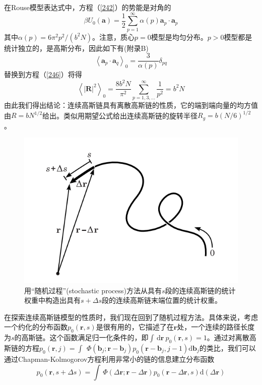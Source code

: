 在Rouse模型表达式中，方程（\ref{242}）的势能是对角的
\begin{equation}\label{255}
\beta U_0(\mathbf{a})=\frac{1}{2}\sum_{p=1}^{\infty}\alpha (p)\mathbf{a}_p \cdot \mathbf{a}_p
\end{equation}
其中$\alpha (p)=6\pi ^2p^2/(b^2N)$。注意，质心$p=0$模型是均匀分布。$p>0$模型都是统计独立的，是高斯分布，因此如下有(附录B)
\begin{equation}\label{256}
\left \langle \mathbf{a}_p \cdot \mathbf{a}_q \right \rangle _0=\frac{3}{\alpha (p)}\delta _{pq}
\end{equation}
替换到方程（\ref{246}）将得
\begin{equation}\label{257}
\left \langle \left| \mathbf{R} \right|^2 \right \rangle _0=\frac{8b^2N}{\pi ^2}\sum_{p=1,3,...}^{\infty}\frac{1}{p^2}=b^2N
\end{equation}
由此我们得出结论：连续高斯链具有离散高斯链的性质，它的端到端向量的均方值由$R=bN^{1/2}$给出。类似用期望公式给出连续高斯链的旋转半径$R_g=b(N/6)^{1/2}$。

\begin{figure}[H]
\centering
\includegraphics[scale=0.7]{./figures/42.png}
\caption{用“随机过程”(stochastic process)方法从具有$s$段的连续高斯链的统计权重中构造出具有$s+\Delta s$段的连续高斯链末端位置的统计权重。} \label{随机过程}
\end{figure}

在探索连续高斯链模型的性质时，我们现在回到了随机过程方法。具体来说，考虑一个约化的分布函数$p_0 (\mathbf{r},s)$是很有用的，它描述了在$\mathbf {r}$处，一个连续的路径长度为$s$的高斯链。这个函数满足归一化条件的，即$\int \, \mathrm{d} \mathbf{r}~p_0(\mathbf{r},s)=1$。通过对离散高斯链的方程$p_0(\mathbf{r},j)=\int \,~\Phi(\mathbf{b}_j;\mathbf{r}-\mathbf{b}_j)p_0(\mathbf{r}-\mathbf{b}_j,j-1) \mathrm{d} \mathbf{b}_j$的类比，我们可以通过Chapman-Kolmogorov方程利用非常小的链的信息建立分布函数
\begin{equation}\label{258}
p_0(\mathbf{r},s+\Delta s)=\int \,\Phi(\Delta \mathbf{r};\mathbf{r}-\Delta \mathbf{r})p_0(\mathbf{r}-\Delta \mathbf{r},s) \mathrm{d}(\Delta \mathbf{r}) 
\end{equation}

